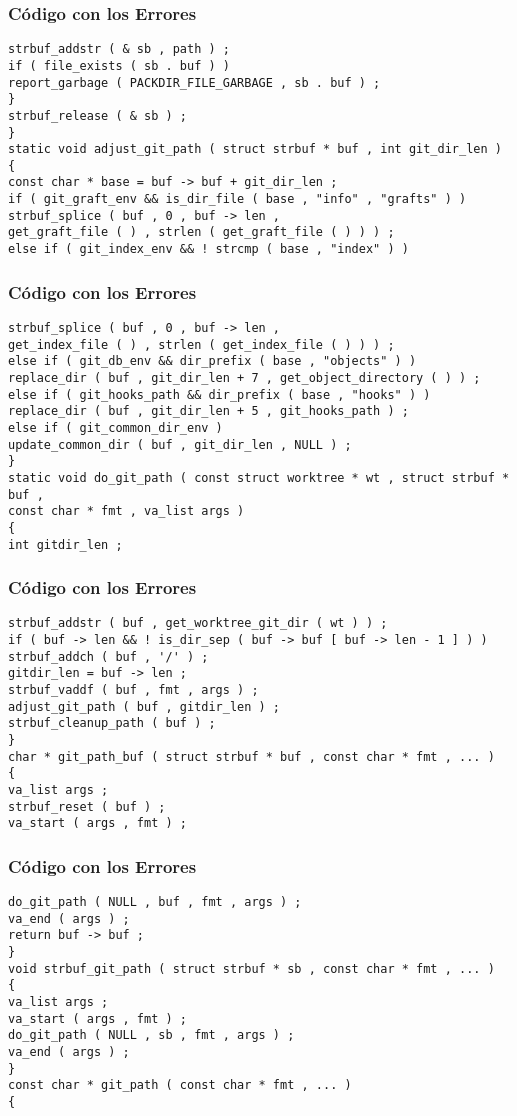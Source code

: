 \documentclass{beamer}
\begin{document}
\begin{frame}[fragile]
\frametitle{C\'odigo con los Errores}
\begin{verbatim}
strbuf_addstr ( & sb , path ) ; 
if ( file_exists ( sb . buf ) ) 
report_garbage ( PACKDIR_FILE_GARBAGE , sb . buf ) ; 
} 
strbuf_release ( & sb ) ; 
} 
static void adjust_git_path ( struct strbuf * buf , int git_dir_len ) 
{ 
const char * base = buf -> buf + git_dir_len ; 
if ( git_graft_env && is_dir_file ( base , "info" , "grafts" ) ) 
strbuf_splice ( buf , 0 , buf -> len , 
get_graft_file ( ) , strlen ( get_graft_file ( ) ) ) ; 
else if ( git_index_env && ! strcmp ( base , "index" ) ) 
\end{verbatim}
\end{frame}
\begin{frame}[fragile]
\frametitle{C\'odigo con los Errores}
\begin{verbatim}
strbuf_splice ( buf , 0 , buf -> len , 
get_index_file ( ) , strlen ( get_index_file ( ) ) ) ; 
else if ( git_db_env && dir_prefix ( base , "objects" ) ) 
replace_dir ( buf , git_dir_len + 7 , get_object_directory ( ) ) ; 
else if ( git_hooks_path && dir_prefix ( base , "hooks" ) ) 
replace_dir ( buf , git_dir_len + 5 , git_hooks_path ) ; 
else if ( git_common_dir_env ) 
update_common_dir ( buf , git_dir_len , NULL ) ; 
} 
static void do_git_path ( const struct worktree * wt , struct strbuf * buf , 
const char * fmt , va_list args ) 
{ 
int gitdir_len ; 
\end{verbatim}
\end{frame}
\begin{frame}[fragile]
\frametitle{C\'odigo con los Errores}
\begin{verbatim}
strbuf_addstr ( buf , get_worktree_git_dir ( wt ) ) ; 
if ( buf -> len && ! is_dir_sep ( buf -> buf [ buf -> len - 1 ] ) ) 
strbuf_addch ( buf , '/' ) ; 
gitdir_len = buf -> len ; 
strbuf_vaddf ( buf , fmt , args ) ; 
adjust_git_path ( buf , gitdir_len ) ; 
strbuf_cleanup_path ( buf ) ; 
} 
char * git_path_buf ( struct strbuf * buf , const char * fmt , ... ) 
{ 
va_list args ; 
strbuf_reset ( buf ) ; 
va_start ( args , fmt ) ; 
\end{verbatim}
\end{frame}
\begin{frame}[fragile]
\frametitle{C\'odigo con los Errores}
\begin{verbatim}
do_git_path ( NULL , buf , fmt , args ) ; 
va_end ( args ) ; 
return buf -> buf ; 
} 
void strbuf_git_path ( struct strbuf * sb , const char * fmt , ... ) 
{ 
va_list args ; 
va_start ( args , fmt ) ; 
do_git_path ( NULL , sb , fmt , args ) ; 
va_end ( args ) ; 
} 
const char * git_path ( const char * fmt , ... ) 
{ 
\end{verbatim}
\end{frame}
\end{document}
